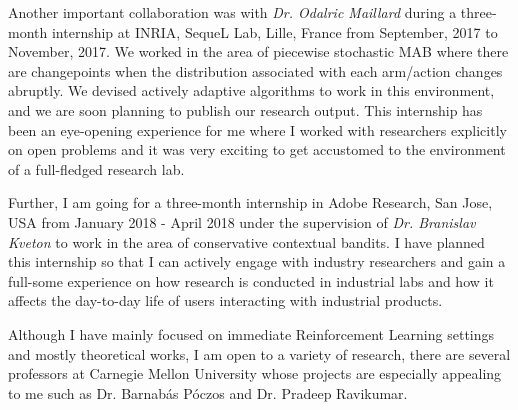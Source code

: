 \documentclass[twoside]{article}
\begin{document}
    Another important collaboration was with \textit{Dr. Odalric Maillard} during a three-month internship at INRIA, SequeL Lab, Lille, France from September, 2017 to November, 2017. We worked in the area of piecewise stochastic MAB where there are changepoints when the distribution associated with each arm/action changes abruptly. We devised actively adaptive algorithms to work in this environment, and we are soon planning to publish our research output. This internship has been an eye-opening experience for me where I worked with researchers explicitly on open problems and it was very exciting to get accustomed to the environment of a full-fledged research lab. 
    
    Further, I am going for a three-month internship in Adobe Research, San Jose, USA from January 2018 - April 2018 under the supervision of \textit{Dr. Branislav Kveton} to work in the area of conservative contextual bandits. I have planned this internship so that I can actively engage with industry researchers and gain a full-some experience on how research is conducted in industrial labs and how it affects the day-to-day life of users interacting with industrial products. 
    
    Although I have mainly focused on immediate Reinforcement Learning settings and mostly theoretical works, I am open to a variety of research, there are several professors at Carnegie Mellon University whose projects are especially appealing to me such as Dr. Barnabás Póczos and Dr. Pradeep Ravikumar.



\end{document}
